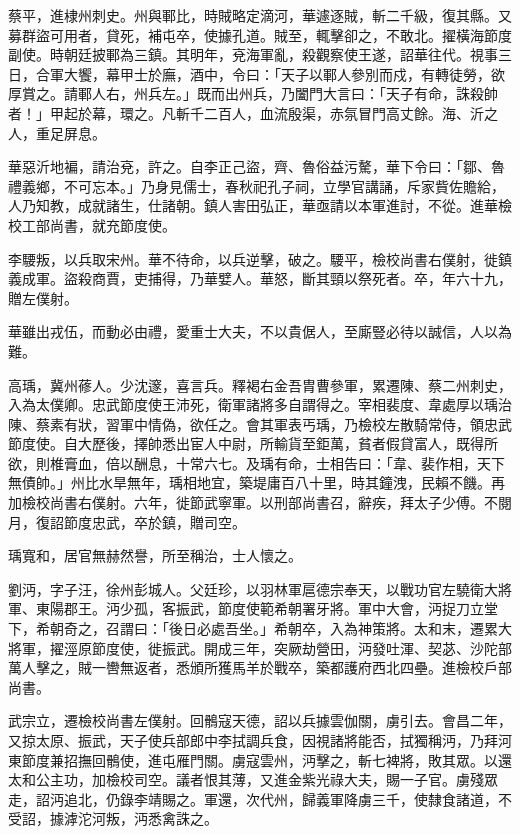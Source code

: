 \begin{pinyinscope}
 蔡平，進棣州刺史。州與鄆比，時賊略定滴河，華遽逐賊，斬二千級，復其縣。又募群盜可用者，貸死，補屯卒，使據孔道。賊至，輒擊卻之，不敢北。擢橫海節度副使。時朝廷披鄆為三鎮。其明年，兗海軍亂，殺觀察使王遂，詔華往代。視事三日，合軍大饗，幕甲士於廡，酒中，令曰：「天子以鄆人參別而戍，有轉徒勞，欲厚賞之。請鄆人右，州兵左。」既而出州兵，乃闔門大言曰：「天子有命，誅殺帥者！」甲起於幕，環之。凡斬千二百人，血流殷渠，赤氛冒門高丈餘。海、沂之人，重足屏息。



 華惡沂地褊，請治兗，許之。自李正己盜，齊、魯俗益污驁，華下令曰：「鄒、魯禮義鄉，不可忘本。」乃身見儒士，春秋祀孔子祠，立學官講誦，斥家貲佐贍給，人乃知教，成就諸生，仕諸朝。鎮人害田弘正，華亟請以本軍進討，不從。進華檢校工部尚書，就充節度使。



 李騕叛，以兵取宋州。華不待命，以兵逆擊，破之。騕平，檢校尚書右僕射，徙鎮義成軍。盜殺商賈，吏捕得，乃華嬖人。華怒，斷其頸以祭死者。卒，年六十九，贈左僕射。



 華雖出戎伍，而動必由禮，愛重士大夫，不以貴倨人，至廝豎必待以誠信，人以為難。



 高瑀，冀州蓚人。少沈邃，喜言兵。釋褐右金吾胄曹參軍，累遷陳、蔡二州刺史，入為太僕卿。忠武節度使王沛死，衛軍諸將多自謂得之。宰相裴度、韋處厚以瑀治陳、蔡素有狀，習軍中情偽，欲任之。會其軍表丐瑀，乃檢校左散騎常侍，領忠武節度使。自大歷後，擇帥悉出宦人中尉，所輸貨至鉅萬，貧者假貸富人，既得所欲，則椎膏血，倍以酬息，十常六七。及瑀有命，士相告曰：「韋、裴作相，天下無債帥。」州比水旱無年，瑀相地宜，築堤庸百八十里，時其鐘洩，民賴不饑。再加檢校尚書右僕射。六年，徙節武寧軍。以刑部尚書召，辭疾，拜太子少傅。不閱月，復詔節度忠武，卒於鎮，贈司空。



 瑀寬和，居官無赫然譽，所至稱治，士人懷之。



 劉沔，字子汪，徐州彭城人。父廷珍，以羽林軍扈德宗奉天，以戰功官左驍衛大將軍、東陽郡王。沔少孤，客振武，節度使範希朝署牙將。軍中大會，沔捉刀立堂下，希朝奇之，召謂曰：「後日必處吾坐。」希朝卒，入為神策將。太和末，遷累大將軍，擢涇原節度使，徙振武。開成三年，突厥劫營田，沔發吐渾、契苾、沙陀部萬人擊之，賊一轡無返者，悉頒所獲馬羊於戰卒，築都護府西北四壘。進檢校戶部尚書。



 武宗立，遷檢校尚書左僕射。回鶻寇天德，詔以兵據雲伽關，虜引去。會昌二年，又掠太原、振武，天子使兵部郎中李拭調兵食，因視諸將能否，拭獨稱沔，乃拜河東節度兼招撫回鶻使，進屯雁門關。虜寇雲州，沔擊之，斬七裨將，敗其眾。以還太和公主功，加檢校司空。議者恨其薄，又進金紫光祿大夫，賜一子官。虜殘眾走，詔沔追北，仍錄李靖賜之。軍還，次代州，歸義軍降虜三千，使隸食諸道，不受詔，據滹沱河叛，沔悉禽誅之。




\end{pinyinscope}
